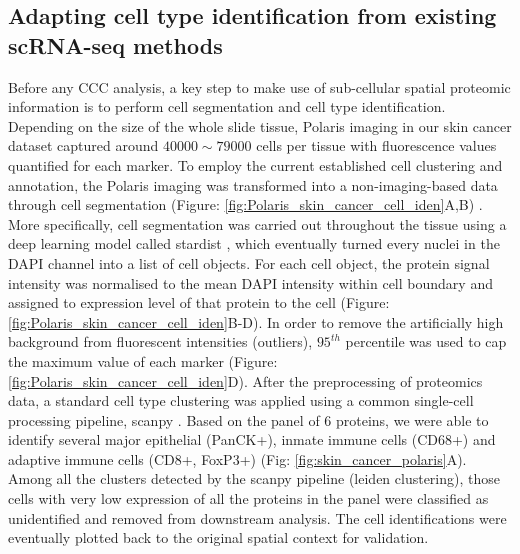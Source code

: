 \subsection{Adapting cell type identification from existing scRNA-seq methods}
Before any CCC analysis, a key step  to make use of sub-cellular spatial proteomic information is to perform cell segmentation and cell type identification. Depending on the size of the whole slide tissue, Polaris imaging in our skin cancer dataset captured around $40000\sim 79000$ cells per tissue with fluorescence values quantified for each marker. To employ the current established cell clustering and annotation, the Polaris imaging was transformed into a non-imaging-based data through cell segmentation (Figure: \ref{fig:Polaris_skin_cancer_cell_iden}A,B) \cite{hickey2021strategies}. More specifically, cell segmentation was carried out throughout the tissue using a deep learning model called stardist \cite{schmidt2018cell}, which eventually turned every nuclei in the DAPI channel into a list of cell objects. For each cell object, the protein signal intensity was normalised to the mean DAPI intensity within cell boundary and assigned to expression level of that protein to the cell (Figure: \ref{fig:Polaris_skin_cancer_cell_iden}B-D). In order to remove the artificially high background from fluorescent intensities (outliers), $95^{th}$ percentile was used to cap the maximum value of each marker (Figure: \ref{fig:Polaris_skin_cancer_cell_iden}D). After the preprocessing of proteomics data, a standard cell type clustering was applied using a common single-cell processing pipeline, scanpy \cite{wolf2018scanpy}. Based on the panel of 6 proteins, we were able to identify several major epithelial (PanCK+), inmate immune cells (CD68+) and adaptive immune cells (CD8+, FoxP3+) (Fig: \ref{fig:skin_cancer_polaris}A). Among all the clusters detected by the scanpy pipeline (leiden clustering), those cells with very low expression of all the proteins in the panel were classified as unidentified and removed from downstream analysis. The cell identifications were eventually plotted back to the original spatial context for validation.  

